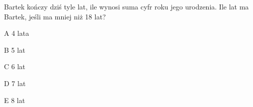 \begin{tresc}
Bartek kończy dziś tyle lat, ile wynosi suma cyfr roku jego urodzenia. Ile lat ma Bartek, jeśli ma mniej niż 18 lat?
\end{tresc}
\begin{wariant}{A} 4 lata \end{wariant}
\begin{wariant}{B} 5 lat \end{wariant}
\begin{wariant}{C} 6 lat \end{wariant}
\begin{wariant}{D} 7 lat \end{wariant}
\begin{wariant}{E} 8 lat \end{wariant}
